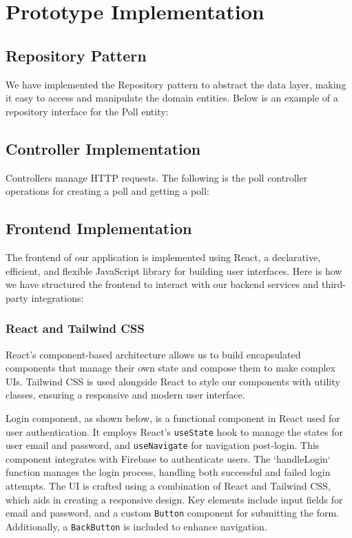 \section{Prototype Implementation}
\label{sec:implementation}

\subsection{Repository Pattern}

We have implemented the Repository pattern to abstract the data layer, making it easy to access and manipulate the domain entities. Below is an example of a repository interface for the Poll entity:


\subsection{Controller Implementation}
Controllers manage HTTP requests. The following is the poll controller operations for creating a poll and getting a poll:



\subsection{Frontend Implementation}

The frontend of our application is implemented using React, a declarative, efficient, and flexible JavaScript library for building user interfaces. Here is how we have structured the frontend to interact with our backend services and third-party integrations:

\subsubsection*{React and Tailwind CSS}
React’s component-based architecture allows us to build encapsulated components that manage their own state and compose them to make complex UIs. Tailwind CSS is used alongside React to style our components with utility classes, ensuring a responsive and modern user interface.



Login component, as shown below, is a functional component in React used for user authentication. It employs React's \texttt{useState} hook to manage the states for user email and password, and \texttt{useNavigate} for navigation post-login. This component integrates with Firebase to authenticate users. The `handleLogin` function manages the login process, handling both successful and failed login attempts. The UI is crafted using a combination of React and Tailwind CSS, which aids in creating a responsive design. Key elements include input fields for email and password, and a custom \texttt{Button} component for submitting the form. Additionally, a \texttt{BackButton} is included to enhance navigation.

